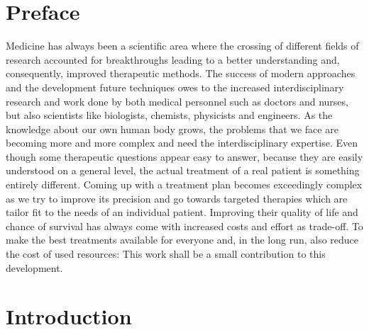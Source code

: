 \chapter*{Preface}

Medicine has always been a scientific area where the crossing of different fields of research accounted for breakthroughs leading to a better understanding and, consequently, improved therapeutic methods.
The success of modern approaches and the development future techniques owes to the increased interdisciplinary research and work done by both medical personnel such as doctors and nurses, but also scientists like biologists, chemists, physicists and engineers.
As the knowledge about our own human body grows, the problems that we face are becoming more and more complex and need the interdisciplinary expertise.
Even though some therapeutic questions appear easy to answer, because they are easily understood on a general level, the actual treatment of a real patient is something entirely different.
Coming up with a treatment plan becomes exceedingly complex as we try to improve its precision and go towards targeted therapies which are tailor fit to the needs of an individual patient.
Improving their quality of life and chance of survival has always come with increased costs and effort as trade-off.
To make the best treatments available for everyone and, in the long run, also reduce the cost of used resources:
This work shall be a small contribution to this development.

\chapter{Introduction}
\label{chap:intro}



